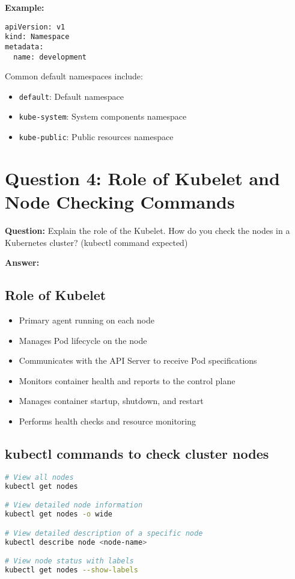\documentclass[12pt,a4paper]{article}
\begin{document}
\textbf{Example:}
\begin{lstlisting}
apiVersion: v1
kind: Namespace
metadata:
  name: development
\end{lstlisting}

Common default namespaces include:
\begin{itemize}
    \item \texttt{default}: Default namespace
    \item \texttt{kube-system}: System components namespace
    \item \texttt{kube-public}: Public resources namespace
\end{itemize}

\section{Question 4: Role of Kubelet and Node Checking Commands}

\textbf{Question:} Explain the role of the Kubelet. How do you check the nodes in a Kubernetes cluster? (kubectl command expected)

\textbf{Answer:}

\subsection{Role of Kubelet}
\begin{itemize}
    \item Primary agent running on each node
    \item Manages Pod lifecycle on the node
    \item Communicates with the API Server to receive Pod specifications
    \item Monitors container health and reports to the control plane
    \item Manages container startup, shutdown, and restart
    \item Performs health checks and resource monitoring
\end{itemize}

\subsection{kubectl commands to check cluster nodes}
\begin{lstlisting}[language=bash]
# View all nodes
kubectl get nodes

# View detailed node information
kubectl get nodes -o wide

# View detailed description of a specific node
kubectl describe node <node-name>

# View node status with labels
kubectl get nodes --show-labels
\end{lstlisting}
\end{document}

